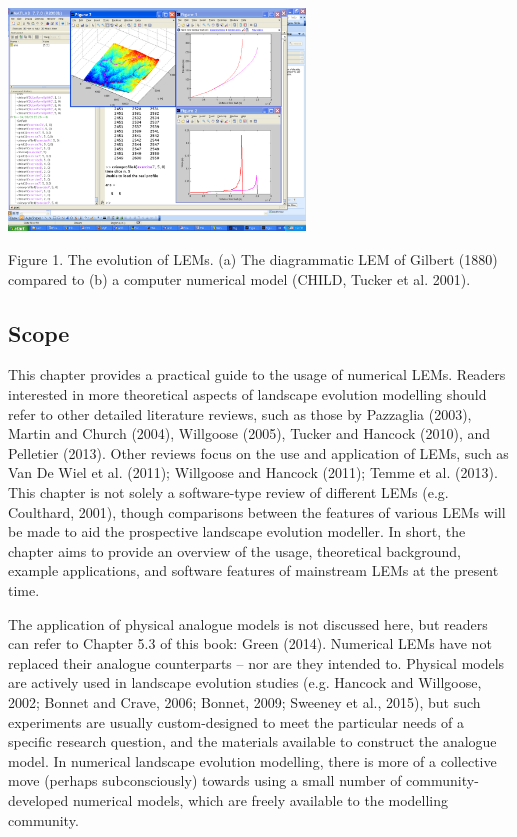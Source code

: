 \includegraphics[width=7.883cm]{LEMFinalRevisedmanuscriptDAVFinalrevisions-img/LEMFinalRevisedmanuscriptDAVFinalrevisions-img002.png} 

Figure 1. The evolution of LEMs. (a) The diagrammatic LEM of Gilbert (1880) compared to (b) a computer numerical model (CHILD, Tucker et al. 2001). 

\subsection[Scope]{Scope}
This chapter provides a practical guide to the usage of numerical LEMs. Readers interested in more theoretical aspects of landscape evolution modelling should refer to other detailed literature reviews, such as those by Pazzaglia (2003), Martin and Church (2004), Willgoose (2005), Tucker and Hancock (2010), and Pelletier (2013). Other reviews focus on the use and application of LEMs, such as Van De Wiel et al. (2011); Willgoose and Hancock (2011); Temme et al. (2013). This chapter is not solely a software-type review of different LEMs (e.g. Coulthard, 2001), though comparisons between the features of various LEMs will be made to aid the prospective landscape evolution modeller. In short, the chapter aims to provide an overview of the usage, theoretical background, example applications, and software features of mainstream LEMs at the present time.

The application of physical analogue models is not discussed here, but readers can refer to Chapter 5.3 of this book: Green (2014). Numerical LEMs have not replaced their analogue counterparts – nor are they intended to. Physical models are actively used in landscape evolution studies (e.g. Hancock and Willgoose, 2002; Bonnet and Crave, 2006; Bonnet, 2009; Sweeney et al., 2015), but such experiments are usually custom-designed to meet the particular needs of a specific research question, and the materials available to construct the analogue model. In numerical landscape evolution modelling, there is more of a collective move (perhaps subconsciously) towards using a small number of community-developed numerical models, which are freely available to the modelling community.

